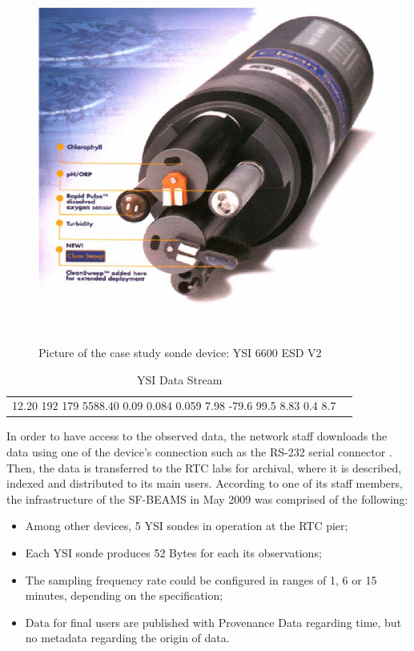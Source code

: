 \begin{figure}[!b]
  \centering
  \includegraphics[scale=0.7]{../diagrams/ysi-device}
  \caption{Picture of the case study sonde device: YSI 6600 ESD V2}
  \label{fig:ysi-device}
\end{figure}

\begin{table}
    \caption{YSI Data Stream}
    \begin{center}
        \begin{tabular}{lr}
  12.20    192    179 5588.40   0.09   0.084   0.059  7.98   -79.6   99.5  8.83 
  0.4     8.7
        \end{tabular}
    \end{center}
    \label{tab:ysi-data-stream}
\end{table}

In order to have access to the observed data, the network staff downloads
the data using one of the device's connection such as the RS-232 serial
connector \cite{rs232}. Then, the data is transferred to the RTC labs for
archival, where it is described, indexed and distributed to its main users.
According to one of its staff members, the infrastructure of the SF-BEAMS in
May 2009 was comprised of the following:

\begin{itemize}
  \item Among other devices, 5 YSI sondes in operation at the RTC pier;
  \item Each YSI sonde produces 52 Bytes for each its observations;
  \item The sampling frequency rate could be configured in ranges of 1, 6 or
  15 minutes, depending on the specification;
  \item Data for final users are published with Provenance Data regarding time,
  but no metadata regarding the origin of data.
\end{itemize}

